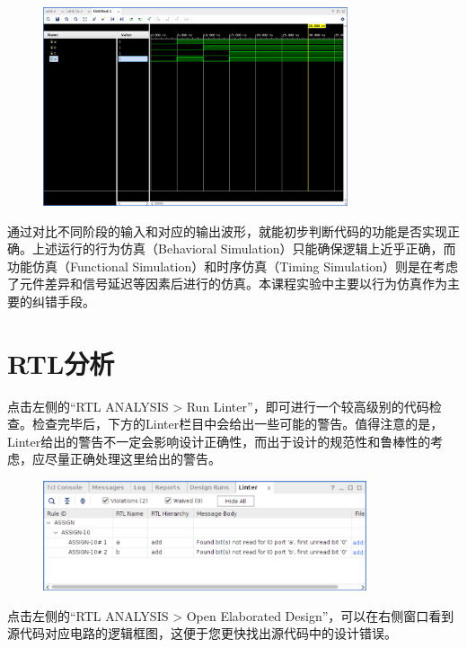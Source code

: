 \documentclass{ctexart}
\begin{document}
\begin{figure}[H]
    \centering
    \includegraphics[width=0.8\textwidth]{lab0/23.png}
\end{figure}

通过对比不同阶段的输入和对应的输出波形，就能初步判断代码的功能是否实现正确。上述运行的行为仿真（Behavioral Simulation）只能确保逻辑上近乎正确，而功能仿真（Functional Simulation）和时序仿真（Timing Simulation）则是在考虑了元件差异和信号延迟等因素后进行的仿真。本课程实验中主要以行为仿真作为主要的纠错手段。


\section{RTL分析}

点击左侧的“RTL ANALYSIS > Run Linter”，即可进行一个较高级别的代码检查。检查完毕后，下方的Linter栏目中会给出一些可能的警告。值得注意的是，Linter给出的警告不一定会影响设计正确性，而出于设计的规范性和鲁棒性的考虑，应尽量正确处理这里给出的警告。

\begin{figure}[H]
    \centering
    \includegraphics[width=0.85\textwidth]{lab0/24.png}
\end{figure}

点击左侧的“RTL ANALYSIS > Open Elaborated Design”，可以在右侧窗口看到源代码对应电路的逻辑框图，这便于您更快找出源代码中的设计错误。
\end{document}
